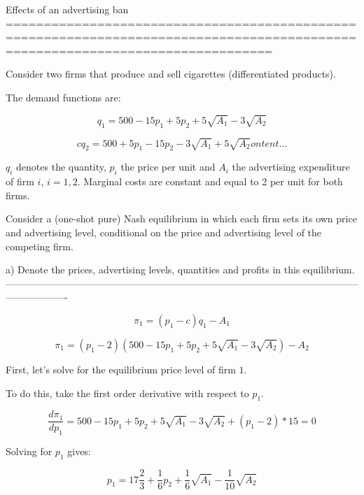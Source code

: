 \documentclass[12pt,english]{article}%
\begin{document}
Effects of an advertising ban
===============================================================================================================================

Consider two firms that produce and sell cigarettes (differentiated products).

The demand functions are:

\begin{equation}
q_1=500-15p_1+5p_2+5\sqrt{A_1}-3\sqrt{A_2}
\end{equation}

\begin{equation}
cq_2=500+5p_1-15p_2-3\sqrt{A_1}+5\sqrt{A_2}ontent...
\end{equation}

$q_i$ denotes the quantity, $p_i$ the price per unit and $A_i$ the advertising expenditure of firm $i$, $i=1,2$.
Marginal costs are constant and equal to 2 per unit for both firms. 

Consider a (one-shot pure) Nash equilibrium in which each firm sets its own price and advertising level, conditional on the price and advertising level of the competing firm. 

a) Denote the prices, advertising levels, quantities and profits in this equilibrium.
-------------------------------------------------------------------------------------------------------------------------------

\begin{equation}
\pi_1=(p_1-c)q_1-A_1
\end{equation}

\begin{equation}
\pi_1=(p_1-2)(500-15p_1+5p_2+5\sqrt{A_1}-3\sqrt{A_2})-A_2
\end{equation}


First, let's solve for the equilibrium price level of firm $1$.
 
To do this, take the first order derivative with respect to $p_1$.

\begin{equation}
\frac{d\pi_1}{dp_1}=500-15p_1+5p_2+5\sqrt{A_1}-3\sqrt{A_2}+(p_1-2)*15=0
\end{equation}

Solving for $p_1$ gives:

\begin{equation}
p_1=17\frac{2}{3}+\frac{1}{6}p_2+\frac{1}{6}\sqrt{A_1}-\frac{1}{10}\sqrt{A_2}
\end{equation}
\end{document}
